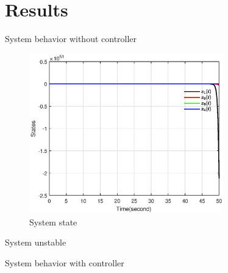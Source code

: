 \documentclass[dvipsnames,mathserif]{beamer}
\begin{document}
{    \section{Results}

    \begin{frame}
      \footnotesize
      System behavior without controller
      \begin{figure}[H]
        \centering
        \includegraphics[width=0.75\textwidth]{x_1.eps}
        \caption{System state}
      \end{figure}
      System unstable
    \end{frame}

    \begin{frame}
      System behavior with controller


\end{frame}}
\end{document}

